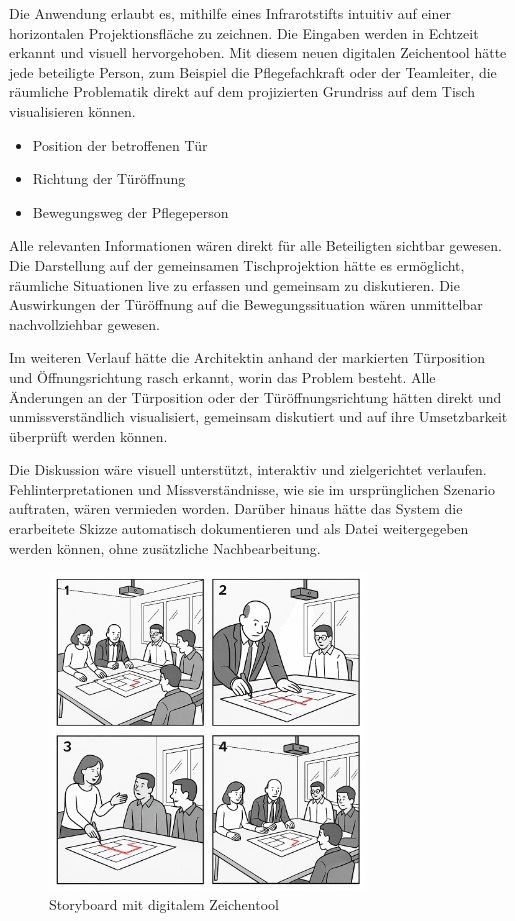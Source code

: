  Die Anwendung erlaubt es, mithilfe eines Infrarotstifts intuitiv auf einer horizontalen Projektionsfläche zu zeichnen. Die Eingaben werden in Echtzeit erkannt und visuell hervorgehoben. Mit diesem neuen digitalen Zeichentool hätte jede beteiligte Person, zum Beispiel die Pflegefachkraft oder der Teamleiter, die räumliche Problematik direkt auf dem projizierten Grundriss auf dem Tisch visualisieren können.

\begin{itemize}
    \item Position der betroffenen Tür
    \item Richtung der Türöffnung
    \item Bewegungsweg der Pflegeperson
\end{itemize}

Alle relevanten Informationen wären direkt für alle Beteiligten sichtbar gewesen.  
Die Darstellung auf der gemeinsamen Tischprojektion hätte es ermöglicht, räumliche Situationen live zu erfassen und gemeinsam zu diskutieren.  
Die Auswirkungen der Türöffnung auf die Bewegungssituation wären unmittelbar nachvollziehbar gewesen.

Im weiteren Verlauf hätte die Architektin anhand der markierten Türposition und Öffnungsrichtung rasch erkannt, worin das Problem besteht.
Alle Änderungen an der Türposition oder der Türöffnungsrichtung hätten direkt und unmissverständlich visualisiert, gemeinsam diskutiert und auf ihre Umsetzbarkeit überprüft werden können.

Die Diskussion wäre visuell unterstützt, interaktiv und zielgerichtet verlaufen.  
Fehlinterpretationen und Missverständnisse, wie sie im ursprünglichen Szenario auftraten, wären vermieden worden.  
Darüber hinaus hätte das System die erarbeitete Skizze automatisch dokumentieren und als Datei weitergegeben werden können, ohne zusätzliche Nachbearbeitung.

\begin{figure}[H]
    \centering
    \includegraphics[width=0.75\textwidth]{graphics/UserStory_with_Solution.png}
    \caption{Storyboard mit digitalem Zeichentool}
    \label{fig:userstory-mit}
\end{figure}

